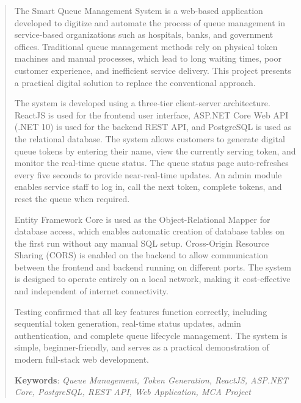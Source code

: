 \NoBgThispage
\begin{abstract}

The Smart Queue Management System is a web-based application developed to digitize and automate the process of queue management in service-based organizations such as hospitals, banks, and government offices. Traditional queue management methods rely on physical token machines and manual processes, which lead to long waiting times, poor customer experience, and inefficient service delivery. This project presents a practical digital solution to replace the conventional approach.

The system is developed using a three-tier client-server architecture. ReactJS is used for the frontend user interface, ASP.NET Core Web API (.NET 10) is used for the backend REST API, and PostgreSQL is used as the relational database. The system allows customers to generate digital queue tokens by entering their name, view the currently serving token, and monitor the real-time queue status. The queue status page auto-refreshes every five seconds to provide near-real-time updates. An admin module enables service staff to log in, call the next token, complete tokens, and reset the queue when required.

Entity Framework Core is used as the Object-Relational Mapper for database access, which enables automatic creation of database tables on the first run without any manual SQL setup. Cross-Origin Resource Sharing (CORS) is enabled on the backend to allow communication between the frontend and backend running on different ports. The system is designed to operate entirely on a local network, making it cost-effective and independent of internet connectivity.

Testing confirmed that all key features function correctly, including sequential token generation, real-time status updates, admin authentication, and complete queue lifecycle management. The system is simple, beginner-friendly, and serves as a practical demonstration of modern full-stack web development.

{\bf Keywords}: {\it Queue Management, Token Generation, ReactJS, ASP.NET Core, PostgreSQL, REST API, Web Application, MCA Project}

\end{abstract}

